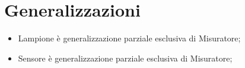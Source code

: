 \section{Generalizzazioni}

\begin{itemize}
    \item Lampione è generalizzazione parziale esclusiva di Misuratore;
    \item Sensore è generalizzazione parziale esclusiva di Misuratore;
\end{itemize}